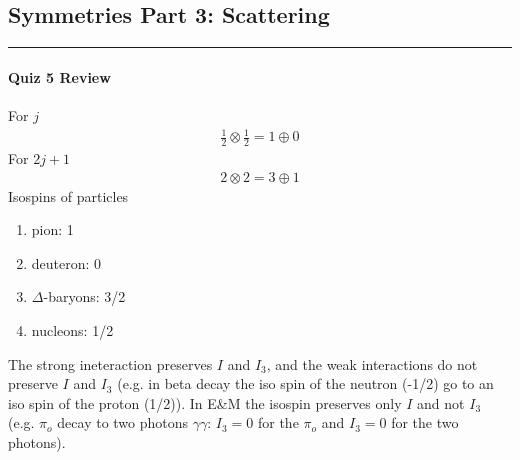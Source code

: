 \documentclass[../main.tex]{subfiles}
\begin{document}
\subsection*{Symmetries Part 3: Scattering}
\hrule \vspace{10px}

\paragraph{Quiz 5 Review}
For $j$
\begin{align*}
    \frac{1}{2} \otimes \frac{1}{2} = 1 \oplus 0
\end{align*}
For $2j + 1$
\begin{align*}
    2 \otimes 2 = 3 \oplus 1
\end{align*}
Isospins of particles
\begin{enumerate}
    \item pion: 1
    \item deuteron: 0
    \item $\Delta$-baryons: 3/2
    \item nucleons: 1/2
\end{enumerate}
The strong ineteraction preserves $I$ and $I_3$, and the weak interactions do not preserve $I$ and
$I_3$ (e.g. in beta decay the iso spin of the neutron (-1/2) go to an iso spin of the proton (1/2)).
In E\&M the isospin preserves only $I$ and not $I_3$ (e.g. $\pi_o$ decay to two photons
$\gamma \gamma$: $I_3 = 0$ for the $\pi_o$ and $I_3 = 0$ for the two photons).
\end{document}
